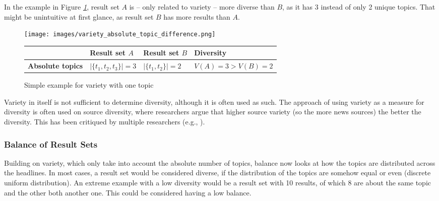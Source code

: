 In the example in Figure \textit{\ref{fig:variety_absolute_topic_difference}}, result set $A$ is – only related to variety – more diverse than $B$, as it has 3 instead of only 2 unique topics. 
That might be unintuitive at first glance, as result set $B$ has more results than $A$.

\begin{figure}[tb]
    \centering
    \texttt{[image: images/variety\_absolute\_topic\_difference.png]}
    
        \begin{tabularx}{\textwidth}{XXXl}
        \toprule 
        & \textbf{Result set $A$} & \textbf{Result set $B$} & \textbf{Diversity} \\
        \midrule
        \textbf{Absolute topics} & $|\{t_1, t_2, t_3\}| = 3$ & $|\{t_1, t_2\}| = 2$ & $V(A)=3 > V(B)=2$ \\
        \bottomrule
        \end{tabularx}
    
    \caption{Simple example for variety with one topic}
    \label{fig:variety_absolute_topic_difference}
\end{figure}

Variety in itself is not sufficient to determine diversity, although it is often used as such. The approach of using variety as a measure for diversity is often used on source diversity, where researchers argue that higher source variety (so the more news sources) the better the diversity. This has been critiqued by multiple researchers (e.g., \citet{carpenter_study_2010,napoli_deconstructing_1999}).


\subsubsection{Balance of Result Sets}

Building on variety, which only take into account the absolute number of topics, balance now looks at how the topics are distributed across the headlines. 
In most cases, a result set would be considered diverse, if the distribution of the topics are somehow equal or even (discrete uniform distribution). 
An extreme example with a low diversity would be a result set with 10 results, of which 8 are about the same topic and the other both another one. This could be considered having a low balance. 


